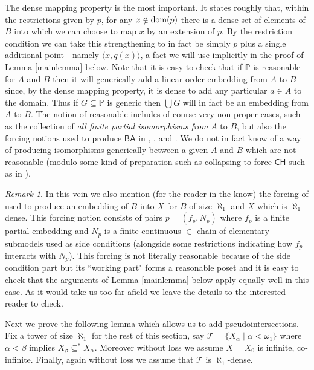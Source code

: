\documentclass[leqno,11pt]{amsart}
\theoremstyle{definition}
\theoremstyle{remark}
\newtheorem{remark}{Remark}
\def\BA{\mathsf{BA}}
\def\CH {\mathsf{CH}}
\def\P{\mathbb P}
\begin{document}
The dense mapping property is the most important. It states roughly that, within the restrictions given by $p$, for any $x \notin{\rm dom}(p)$ there is a dense set of elements of $B$ into which we can choose to map $x$ by an extension of $p$. By the restriction condition we can take this strengthening to in fact be simply $p$ plus a single additional point - namely $\langle x, q(x)\rangle$, a fact we will use implicitly in the proof of Lemma \ref{mainlemma} below. Note that it is easy to check that if $\P$ is reasonable for $A$ and $B$ then it will generically add a linear order embedding from $A$ to $B$ since, by the dense mapping property, it is dense to add any particular $a \in A$ to the domain. Thus if $G \subseteq \P$ is generic then $\bigcup G$ will in fact be an embedding from $A$ to $B$. The notion of reasonable includes of course very non-proper cases, such as the collection of {\em all finite partial isomorphisms from} $A$ to $B$, but also the forcing notions used to produce $\BA$ in \cite{Baum73}, \cite{BaumPFA}, \cite{ARS85} and \cite[Chapter 15]{todorcevicnotesonforcingaxioms}. We do not in fact know of a way of producing isomorphisms generically between a given $A$ and $B$ which are not reasonable (modulo some kind of preparation such as collapsing to force $\CH$ such as in \cite{BaumPFA}).

\begin{remark}
    In this vein we also mention (for the reader in the know) the forcing of \cite[Theorem 93]{todorcevicnotesonforcingaxioms} used to produce an embedding of $B$ into $X$ for $B$ of size $\aleph_1$ and $X$ which is $\aleph_1$-dense. This forcing notion consists of pairs $p = (f_p, N_p)$ where $f_p$ is a finite partial embedding and $N_p$ is a finite continuous $\in$-chain of elementary submodels used as side conditions (alongside some restrictions indicating how $f_p$ interacts with $N_p$). This forcing is not literally reasonable because of the side condition part but its ``working part" forms a reasonable poset and it is easy to check that the arguments of Lemma \ref{mainlemma} below apply equally well in this case. As it would take us too far afield we leave the details to the interested reader to check. 
\end{remark}

Next we prove the following lemma which allows us to add pseudointersections. Fix a tower of size $\aleph_1$ for the rest of this section, say $\mathcal T = \{X_\alpha \; | \; \alpha < \omega_1\}$ where $\alpha < \beta$ implies $X_\beta \subseteq^* X_\alpha$. Moreover without loss we assume $X = X_0$ is infinite, co-infinite. Finally, again without loss we assume that $\mathcal T$ is $\aleph_1$-dense. 
\end{document}
